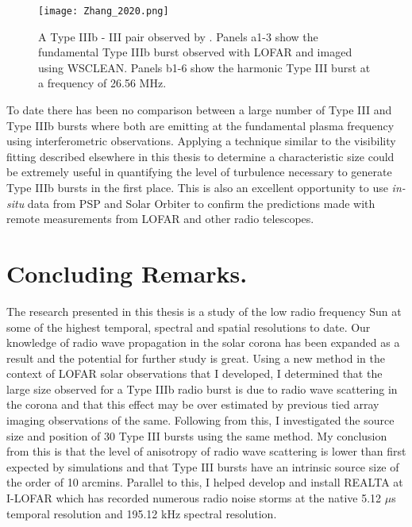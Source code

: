 \begin{figure}[ht]
\centering
\texttt{[image: Zhang\_2020.png]}
\caption[Type IIIb - III pair observed by \cite{Zhang2020}]{A Type IIIb - III pair observed by \cite{Zhang2020}. Panels a1-3 show the fundamental Type IIIb burst observed with LOFAR and imaged using WSCLEAN. Panels b1-6 show the harmonic Type III burst at a frequency of 26.56 MHz.}
\label{fig:typeIIIbIII}
\end{figure}

To date there has been no comparison between a large number of Type III and Type IIIb bursts where both are emitting at the fundamental plasma frequency using interferometric observations. Applying a technique similar to the visibility fitting described elsewhere in this thesis to determine a characteristic size could be extremely useful in quantifying the level of turbulence necessary to generate Type IIIb bursts in the first place. This is also an excellent opportunity to use \textit{in-situ} data from PSP and Solar Orbiter to confirm the predictions made with remote measurements from LOFAR and other radio telescopes. 


\section{Concluding Remarks.}
The research presented in this thesis is a study of the low radio frequency Sun at some of the highest temporal, spectral and spatial resolutions to date. Our knowledge of radio wave propagation in the solar corona has been expanded as a result and the potential for further study is great. Using a new method in the context of LOFAR solar observations that I developed, I determined that the large size observed for a Type IIIb radio burst is due to radio wave scattering in the corona and that this effect may be over estimated by previous tied array imaging observations of the same. Following from this, I investigated the source size and position of 30 Type III bursts using the same method. My conclusion from this is that the level of anisotropy of radio wave scattering is lower than first expected by simulations and that Type III bursts have an intrinsic source size of the order of 10 arcmins. Parallel to this, I helped develop and install REALTA at I-LOFAR which has recorded numerous radio noise storms at the native 5.12 $\mu$s temporal resolution and 195.12 kHz spectral resolution. 

